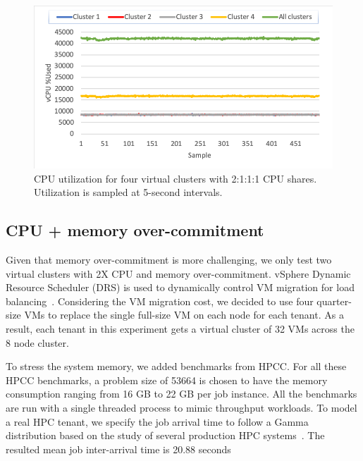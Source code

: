 \begin{figure}[!t]
   \begin{center}
       \includegraphics[width=\columnwidth]{Figures/share_utilization}
   \end{center}
   \caption{CPU utilization for four virtual clusters with 2:1:1:1 CPU shares. Utilization is sampled at 5-second intervals.}
   \label{fig:share_utilization}
 \end{figure}

\subsection{CPU + memory over-commitment}
Given that memory over-commitment is more challenging, we only test two virtual clusters with 2X CPU and memory over-commitment. vSphere Dynamic Resource Scheduler (DRS) is used to dynamically control VM migration for load balancing~\cite{infrastructure2006resource}. Considering the VM migration cost, we decided to use four quarter-size VMs to replace the single full-size VM on each node for each tenant. As a result, each tenant in this experiment gets a virtual cluster of 32 VMs across the 8 node cluster. 

To stress the system memory, we added benchmarks from HPCC. For all these HPCC benchmarks, a problem size of 53664 is chosen to have the memory consumption ranging from 16 GB to 22 GB per job instance. All the benchmarks are run with a single threaded process to mimic throughput workloads. 
To model a real HPC tenant, we specify the job arrival time to follow a Gamma distribution based on the study of several production HPC systems~\cite{lublin2003workload}.  
The resulted mean job inter-arrival time is 20.88 seconds

